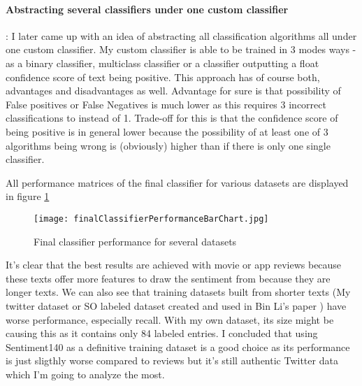 \paragraph{Abstracting several classifiers under one custom classifier}:
I later came up with an idea of abstracting all classification algorithms all under one custom classifier. My custom classifier is able to be trained in 3 modes ways - as a binary classifier, multiclass classifier or a classifier outputting a float confidence score of text being positive.
This approach has of course both, advantages and disadvantages as well. Advantage for sure is that possibility of False positives or False Negatives is much lower as this requires 3 incorrect classifications to instead of 1. Trade-off for this is that the confidence score of being positive is in general lower because the possibility of at least one of 3 algorithms being wrong is (obviously) higher than if there is only one single classifier.

All performance matrices of the final classifier for various datasets are displayed in figure \ref{fig:finalClassifierPerformanceBarChart}


\begin{figure}[H]%
    \centering
	\texttt{[image: finalClassifierPerformanceBarChart.jpg]}
    \caption{Final classifier performance for several datasets}%
    \label{fig:finalClassifierPerformanceBarChart}%
\end{figure}

It's clear that the best results are achieved with movie or app reviews because these texts offer more features to draw the sentiment from because they are longer texts. We can also see that training datasets built from shorter texts (My twitter dataset or SO labeled dataset created and used in Bin Li's paper ) have worse performance, especially recall. With my own dataset, its size might be causing this as it contains only 84 labeled entries. I concluded that using Sentiment140 as a definitive training dataset is a good choice as its performance is just sligthly worse compared to reviews but it's still authentic Twitter data which I'm going to analyze the most.